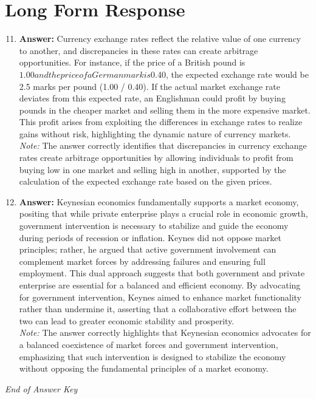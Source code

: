 \documentclass[12pt]{article}
\begin{document}
\section*{Long Form Response}
\begin{enumerate}[label=\arabic*.]
\setcounter{enumi}{10}
\item \textbf{Answer:} Currency exchange rates reflect the relative value of one currency to another, and discrepancies in these rates can create arbitrage opportunities. For instance, if the price of a British pound is $1.00 and the price of a German mark is $0.40, the expected exchange rate would be 2.5 marks per pound (1.00 / 0.40). If the actual market exchange rate deviates from this expected rate, an Englishman could profit by buying pounds in the cheaper market and selling them in the more expensive market. This profit arises from exploiting the differences in exchange rates to realize gains without risk, highlighting the dynamic nature of currency markets.
\\ \textit{Note:} The answer correctly identifies that discrepancies in currency exchange rates create arbitrage opportunities by allowing individuals to profit from buying low in one market and selling high in another, supported by the calculation of the expected exchange rate based on the given prices.
\item \textbf{Answer:} Keynesian economics fundamentally supports a market economy, positing that while private enterprise plays a crucial role in economic growth, government intervention is necessary to stabilize and guide the economy during periods of recession or inflation. Keynes did not oppose market principles; rather, he argued that active government involvement can complement market forces by addressing failures and ensuring full employment. This dual approach suggests that both government and private enterprise are essential for a balanced and efficient economy. By advocating for government intervention, Keynes aimed to enhance market functionality rather than undermine it, asserting that a collaborative effort between the two can lead to greater economic stability and prosperity.
\\ \textit{Note:} The answer correctly highlights that Keynesian economics advocates for a balanced coexistence of market forces and government intervention, emphasizing that such intervention is designed to stabilize the economy without opposing the fundamental principles of a market economy.
\end{enumerate}

\vfill
\noindent\textit{End of Answer Key}
\end{document}
